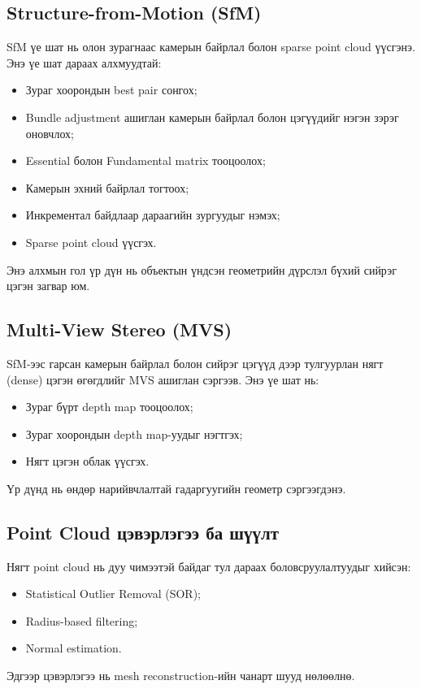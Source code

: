 \subsection{Structure-from-Motion (SfM)}
SfM үе шат нь олон зурагнаас камерын байрлал болон sparse point cloud үүсгэнэ. Энэ үе шат дараах алхмуудтай:
\begin{itemize}
    \item Зураг хоорондын best pair сонгох;
    \item Bundle adjustment ашиглан камерын байрлал болон цэгүүдийг нэгэн зэрэг оновчлох;
    \item Essential болон Fundamental matrix тооцоолох;
    \item Камерын эхний байрлал тогтоох;
    \item Инкрементал байдлаар дараагийн зургуудыг нэмэх;
    \item Sparse point cloud үүсгэх.
\end{itemize}
Энэ алхмын гол үр дүн нь объектын үндсэн геометрийн дүрслэл бүхий сийрэг цэгэн загвар юм.

\subsection{Multi-View Stereo (MVS)}
SfM-ээс гарсан камерын байрлал болон сийрэг цэгүүд дээр тулгуурлан нягт (dense) цэгэн өгөгдлийг MVS ашиглан сэргээв. Энэ үе шат нь:
\begin{itemize}
    \item Зураг бүрт depth map тооцоолох;
    \item Зураг хоорондын depth map-уудыг нэгтгэх;
    \item Нягт цэгэн облак үүсгэх.
\end{itemize}
Үр дүнд нь өндөр нарийвчлалтай гадаргуугийн геометр сэргээгдэнэ.

\subsection{Point Cloud цэвэрлэгээ ба шүүлт}
Нягт point cloud нь дуу чимээтэй байдаг тул дараах боловсруулалтуудыг хийсэн:
\begin{itemize}
    \item Statistical Outlier Removal (SOR);
    \item Radius-based filtering;
    \item Normal estimation.
\end{itemize}
Эдгээр цэвэрлэгээ нь mesh reconstruction-ийн чанарт шууд нөлөөлнө.

